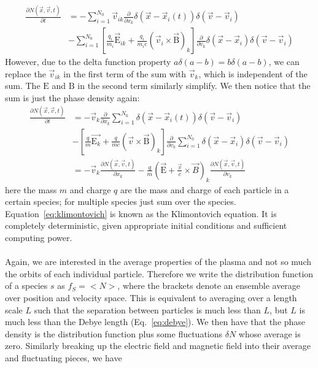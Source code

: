 \begin{align*}
  \frac{\partial N(\vec x,\vec v,t)}{\partial t}&=-\sum_{i=1}^{N_0} \vec v_{ik}\frac{\partial}{\partial x_k} \delta(\vec x-\vec x_i(t))\delta(\vec v-\vec v_i)\\
  &-\sum_{i=1}^{N_0} \left[\frac{q_i}{m_i}\vec{\mathrm{E}}_{ik}+\frac{q_i}{m_i c}(\vec v_i\times\vec{\mathrm{B}})_k\right]\frac{\partial}{\partial v_k}\delta(\vec x-\vec x_i)\delta(\vec v-\vec v_i)
\end{align*}
However, due to the delta function property $a\delta(a-b)=b\delta(a-b)$, we can replace the $\vec v_{ik}$ in the first term of the sum with $\vec v_k$, which is independent of the sum. The $\mathrm{E}$ and $\mathrm{B}$ in the second term similarly simplify. We then notice that the sum is just the phase density again:
\begin{align}
  \frac{\partial N(\vec x,\vec v,t)}{\partial t}&=-\vec v_k\frac{\partial}{\partial x_k}\sum_{i=1}^{N_0} \delta(\vec x-\vec x_i(t))\delta(\vec v-\vec v_i)\nonumber\\
  &- \left[\frac{q}{m}\vec{\mathrm{E}_k}+\frac{q}{m c}(\vec v\times\vec{\mathrm{B}})_k\right]\frac{\partial}{\partial v_k}\sum_{i=1}^{N_0}\delta(\vec x-\vec x_i)\delta(\vec v-\vec v_i)\nonumber\\
  &=-\vec v_k\frac{\partial N(\vec x,\vec v,t)}{\partial x_k}-\frac qm\left(\vec{\mathrm{ E}}+\frac{\vec v}c\times\vec B\right)_k\frac{\partial N(\vec x,\vec v,t)}{\partial v_k}\label{eq:klimontovich}
\end{align}
here the mass $m$ and charge $q$ are the mass and charge of each particle in a certain species; for multiple species just sum over the species. Equation~\ref{eq:klimontovich} is known as the Klimontovich equation. It is completely deterministic, given appropriate initial conditions and sufficient computing power. \\
\\
Again, we are interested in the average properties of the plasma and not so much the orbits of each individual particle. Therefore we write the distribution function of a species $s$ as $f_S=<N>$, where the brackets denote an ensemble average over position and velocity space. This is equivalent to averaging over a length scale $L$ such that the separation between particles is much less than $L$, but $L$ is much less than the Debye length (Eq.~\ref{eq:debye}). We then have that the phase density is the distribution function plus some fluctuations $\delta N$ whose average is zero. Similarly breaking up the electric field and magnetic field into their average and fluctuating pieces, we have
